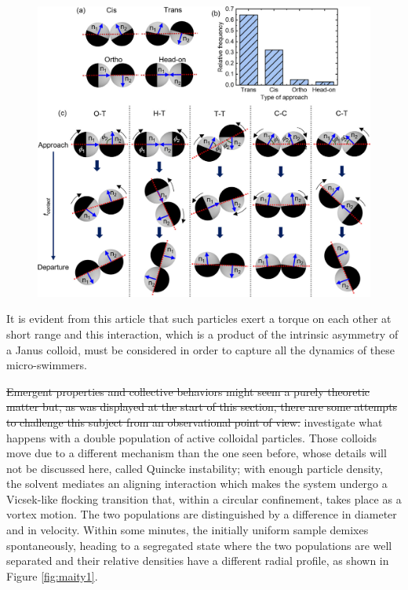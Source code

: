 \documentclass[../../master_thesis_np.tex]{subfiles}
\begin{document}
	\begin{figure}[htp]
		\centering
		\includegraphics[width=\singfigwidth]{singh_pair1.jpeg}
		\caption{\cite{singh_pair_2024}}
		\label{fig:singh_pair1}
	\end{figure}
	
	It is evident from this article that such particles exert a torque on each other at short range and this interaction, which is a product of the intrinsic asymmetry of a Janus colloid, must be considered in order to capture all the dynamics of these micro-swimmers.
		
	\sout{Emergent properties and collective behaviors might seem a purely theoretic matter but, as was displayed at the start of this section, there are some attempts to challenge this subject from an observational point of view. }
	\cite{maity_spontaneous_2023} investigate what happens with a double population of active colloidal particles. 
	Those colloids move due to a different mechanism than the one seen before, whose details will not be discussed here, called Quincke instability; with enough particle density, the solvent mediates an aligning interaction which makes the system undergo a Vicsek-like flocking transition that, within a circular confinement, takes place as a vortex motion. 
	The two populations are distinguished by a difference in diameter and in velocity. 
	Within some minutes, the initially uniform sample demixes spontaneously, heading to a segregated state where the two populations are well separated and their relative densities have a different radial profile, as shown in Figure \ref{fig:maity1}.
	
\end{document}

